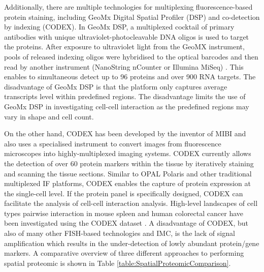 Additionally, there are multiple technologies for multiplexing fluorescence-based protein staining, including GeoMx Digital Spatial Profiler (DSP) and co-detection by indexing (CODEX). In GeoMx DSP, a multiplexed cocktail of primary antibodies with  unique ultraviolet-photocleavable DNA oligos is used to target the proteins. After exposure to ultraviolet light from the GeoMX instrument, pools of released indexing oligos were hybridised to the optical barcodes and then read by another instrument (\ie NanoString nCounter or Illumina MiSeq) \cite{de2020unraveling, helmink2020b}. This enables to simultaneous detect up to 96 proteins and over 900 RNA targets. The disadvantage of GeoMx DSP is that the platform only captures average transcripts level within predefined regions. The disadvantage limits the use of GeoMx DSP in investigating cell-cell interaction as the predefined regions may vary in shape and cell count. 

On the other hand, CODEX has been developed by the inventor of MIBI and also uses a specialised instrument to convert images from fluorescence microscopes into highly-multiplexed imaging systems. CODEX currently allows the detection of over 60 protein markers within the tissue by iteratively staining and scanning the tissue sections\cite{goltsev2018deep}. Similar to OPAL Polaris and other traditional multiplexed IF platforms, CODEX enables the capture of protein expression at the single-cell level. If the protein panel is specifically designed, CODEX can facilitate the analysis of cell-cell interaction analysis. High-level landscapes of cell types pairwise interaction in mouse spleen and human colorectal cancer have been investigated using the CODEX dataset \cite{schurch2020coordinated, goltsev2018CODEX}. A disadvantage of CODEX, but also of many other FISH-based technologies and IMC, is the lack of signal amplification which results in the under-detection of lowly abundant protein/gene markers. A comparative overview of three different approaches to performing spatial proteomic is shown in Table \ref{table:SpatialProteomicComparison}. 

